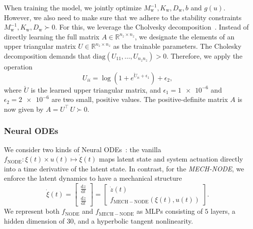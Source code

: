 
When training the model, we jointly optimize $M_\mathrm{w}^{-1}, K_\mathrm{w}, D_\mathrm{w}, b$ and $g(u)$. 
However, we also need to make sure that we adhere to the stability constraints  $M_\mathrm{w}^{-1}, K_\mathrm{w}, D_\mathrm{w} \succ 0$. For this, we leverage the Cholvesky decomposition~\citep{petersen2008matrix}. Instead of directly learning the full matrix $A \in \mathbb{R}^{n_z \times n_z}$, we designate the elements of an upper triangular matrix $U \in \mathbb{R}^{n_z \times n_z}$ as the trainable parameters.
The Cholesky decomposition demands that $\mathrm{diag}(U_{11}, \dots, U_{n_z n_z}) > 0$. Therefore, we apply the operation
\begin{equation}
    U_{ii} = \log \left (1+ e^{\breve{U}_{ii} + \epsilon_1} \right ) + \epsilon_2,
\end{equation}
where $\breve{U}$ is the learned upper triangular matrix, and $\epsilon_1 = \num{1e-6}$ and $\epsilon_2 = \num{2e-6}$ are two small, positive values.
The positive-definite matrix $A$ is now given by $A = U^\top \, U \succ 0$.

\subsubsection{Neural ODEs}
We consider two kinds of Neural ODEs~\citep{chen2018neural}: the vanilla $f_\mathrm{NODE}: \xi(t) \times u(t) \mapsto \dot{\xi}(t)$ maps latent state and system actuation directly into a time derivative of the latent state. In contrast, for the \emph{MECH-NODE}, we enforce the latent dynamics to have a mechanical structure
\begin{equation}
    \dot{\xi}(t) = \begin{bmatrix}
        \frac{\mathrm{d} z}{\mathrm{d}t}\\
        \frac{\mathrm{d} \dot{z}}{\mathrm{d}t}
    \end{bmatrix} = \begin{bmatrix}
        \dot{z}(t)\\
        f_\mathrm{MECH-NODE}(\xi(t), u(t))
    \end{bmatrix}.
\end{equation}
We represent both $f_\mathrm{NODE}$ and $f_\mathrm{MECH-NODE}$ as \glspl{MLP} consisting of $5$ layers, a hidden dimension of $30$, and a hyperbolic tangent nonlinearity.

